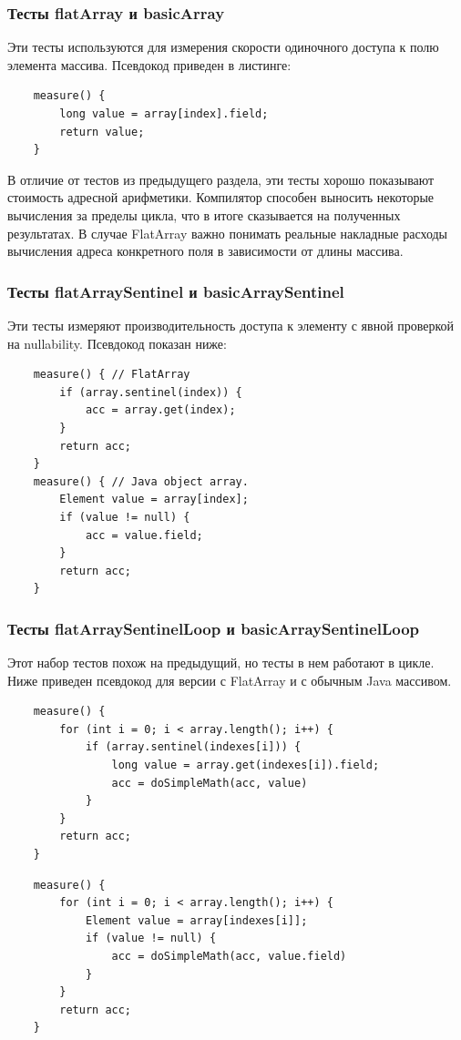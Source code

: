 \subsubsection{Тесты flatArray и basicArray}
Эти тесты используются для измерения скорости одиночного доступа к полю элемента массива. Псевдокод приведен в листинге:
\begin{lstlisting}
	measure() {
		long value = array[index].field;
		return value;
	}
\end{lstlisting}
В отличие от тестов из предыдущего раздела, эти тесты хорошо показывают стоимость адресной арифметики. 
Компилятор способен выносить некоторые вычисления за пределы цикла, что в итоге сказывается на полученных результатах.
В случае FlatArray важно понимать реальные накладные расходы вычисления адреса конкретного поля в зависимости от длины массива.
\subsubsection{Тесты flatArraySentinel и basicArraySentinel}
Эти тесты измеряют производительность доступа к элементу с явной проверкой на nullability. Псевдокод показан ниже:
\begin{lstlisting}
	measure() { // FlatArray
		if (array.sentinel(index)) {
			acc = array.get(index);
		}
		return acc;
	}
	measure() { // Java object array.
		Element value = array[index];
		if (value != null) {
			acc = value.field;
		}
		return acc;
	}
\end{lstlisting}
\subsubsection{Тесты flatArraySentinelLoop и basicArraySentinelLoop}
Этот набор тестов похож на предыдущий, но тесты в нем работают в цикле.
Ниже приведен псевдокод для версии с FlatArray и с обычным Java массивом.
\begin{lstlisting}
	measure() {
		for (int i = 0; i < array.length(); i++) {
			if (array.sentinel(indexes[i])) {
				long value = array.get(indexes[i]).field;
				acc = doSimpleMath(acc, value)
			}
		}
		return acc;
	}
\end{lstlisting}

\begin{lstlisting}
	measure() {
		for (int i = 0; i < array.length(); i++) {
			Element value = array[indexes[i]];
			if (value != null) {
				acc = doSimpleMath(acc, value.field)
			}
		}
		return acc;
	}
\end{lstlisting}

